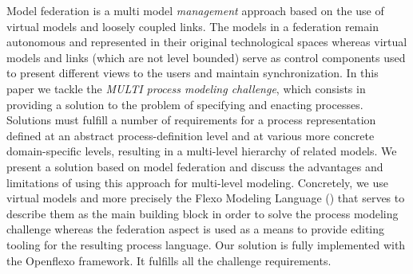 Model federation is a multi model \emph{management} approach based on the use of virtual models and loosely coupled links. The models in a federation remain autonomous and represented in their original technological spaces whereas virtual models and links (which are not level bounded) serve as control components used to present different views to the users and  maintain synchronization. In this paper we tackle the \emph{MULTI process modeling challenge}, which consists in providing a solution to the problem of specifying and enacting processes. Solutions must fulfill a number of requirements for a process representation defined at an abstract process-definition level and at various more concrete domain-specific levels, resulting in a multi-level hierarchy of related models. We present a solution based on model federation and discuss the advantages and limitations of using this approach for multi-level modeling. Concretely, we use virtual models and more precisely the Flexo Modeling Language (\FML) that serves to describe them as the main building block in order to solve the process modeling challenge whereas the federation aspect is used as a means to provide editing tooling for the resulting process language. Our solution is fully implemented with the Openflexo framework. It fulfills all the challenge requirements.


